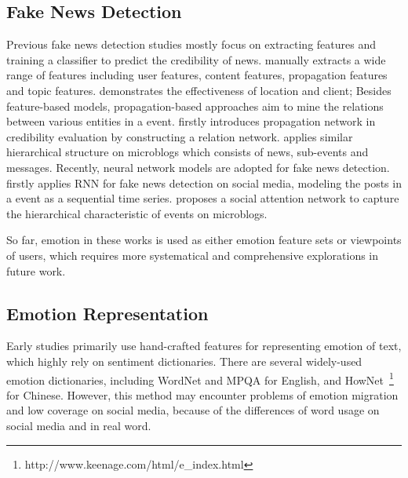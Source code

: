 \documentclass{article}
\newcommand{\kai}[1]{\textcolor{blue}{Kai: {#1}}}
\begin{document}
	\subsection{Fake News Detection}
	Previous fake news detection studies mostly focus on extracting features and training a classifier to predict the credibility of news. \cite{castillo2011information} manually extracts a wide range of features including user features, content features, propagation features and topic features. \cite{yang2012automatic} demonstrates the effectiveness of location and client; Besides feature-based models, propagation-based approaches aim to mine the relations between various entities in a event. \cite{gupta2012evaluating} firstly introduces propagation network in credibility evaluation by constructing a relation network. \cite{jin2014news,jin2016news} applies similar hierarchical structure on microblogs which consists of news, sub-events and messages. Recently, neural network models are adopted for fake news detection. \cite{ma2016detecting} firstly applies RNN for fake news detection on social media, modeling the posts in a event as a sequential time series. \cite{guo2018rumor} proposes a social attention network to capture the hierarchical characteristic of events on microblogs. 
	
	So far,  emotion in these works is used as either emotion feature sets or viewpoints of users, which requires more systematical and comprehensive explorations in future work.
	
	\subsection{Emotion Representation}
	
	Early studies primarily use hand-crafted features for representing emotion of text, which highly rely on sentiment dictionaries. There are several widely-used emotion dictionaries, including WordNet \cite{wordnet} and MPQA \cite{MPQA}for English, and HowNet~\footnote{http://www.keenage.com/html/e\_index.html} for Chinese. However, this method may encounter problems of emotion migration and low coverage on social media, because of the differences of word usage on social media and in real word. 
	
\end{document}
